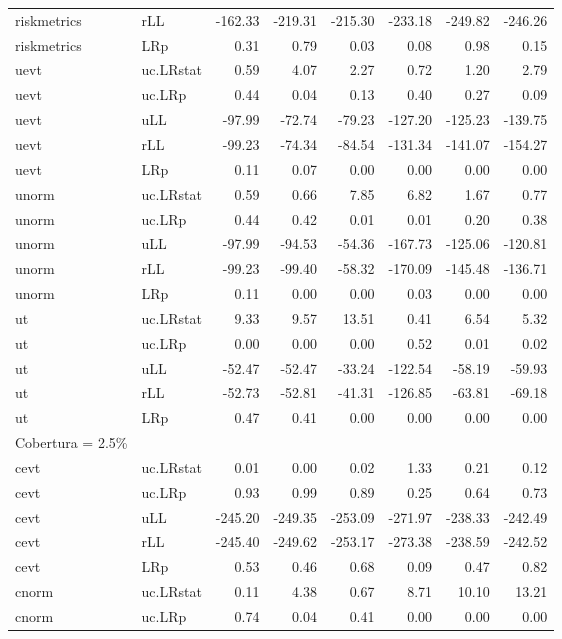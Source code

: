 \begin{longtable}{llrrrrrr}
  riskmetrics & rLL & -162.33 & -219.31 & -215.30 & -233.18 & -249.82 & -246.26 \\ 
  riskmetrics & LRp & 0.31 & 0.79 & 0.03 & 0.08 & 0.98 & 0.15 \\ 
  uevt & uc.LRstat & 0.59 & 4.07 & 2.27 & 0.72 & 1.20 & 2.79 \\ 
  uevt & uc.LRp & 0.44 & 0.04 & 0.13 & 0.40 & 0.27 & 0.09 \\ 
  uevt & uLL & -97.99 & -72.74 & -79.23 & -127.20 & -125.23 & -139.75 \\ 
  uevt & rLL & -99.23 & -74.34 & -84.54 & -131.34 & -141.07 & -154.27 \\ 
  uevt & LRp & 0.11 & 0.07 & 0.00 & 0.00 & 0.00 & 0.00 \\ 
  unorm & uc.LRstat & 0.59 & 0.66 & 7.85 & 6.82 & 1.67 & 0.77 \\ 
  unorm & uc.LRp & 0.44 & 0.42 & 0.01 & 0.01 & 0.20 & 0.38 \\ 
  unorm & uLL & -97.99 & -94.53 & -54.36 & -167.73 & -125.06 & -120.81 \\ 
  unorm & rLL & -99.23 & -99.40 & -58.32 & -170.09 & -145.48 & -136.71 \\ 
  unorm & LRp & 0.11 & 0.00 & 0.00 & 0.03 & 0.00 & 0.00 \\ 
  ut & uc.LRstat & 9.33 & 9.57 & 13.51 & 0.41 & 6.54 & 5.32 \\ 
  ut & uc.LRp & 0.00 & 0.00 & 0.00 & 0.52 & 0.01 & 0.02 \\ 
  ut & uLL & -52.47 & -52.47 & -33.24 & -122.54 & -58.19 & -59.93 \\ 
  ut & rLL & -52.73 & -52.81 & -41.31 & -126.85 & -63.81 & -69.18 \\ 
  ut & LRp & 0.47 & 0.41 & 0.00 & 0.00 & 0.00 & 0.00 \\ 
  Cobertura = 2.5\% &  &  &  &  &  &  &  \\ 
  cevt & uc.LRstat & 0.01 & 0.00 & 0.02 & 1.33 & 0.21 & 0.12 \\ 
  cevt & uc.LRp & 0.93 & 0.99 & 0.89 & 0.25 & 0.64 & 0.73 \\ 
  cevt & uLL & -245.20 & -249.35 & -253.09 & -271.97 & -238.33 & -242.49 \\ 
  cevt & rLL & -245.40 & -249.62 & -253.17 & -273.38 & -238.59 & -242.52 \\ 
  cevt & LRp & 0.53 & 0.46 & 0.68 & 0.09 & 0.47 & 0.82 \\ 
  cnorm & uc.LRstat & 0.11 & 4.38 & 0.67 & 8.71 & 10.10 & 13.21 \\ 
  cnorm & uc.LRp & 0.74 & 0.04 & 0.41 & 0.00 & 0.00 & 0.00 \\ 

\end{longtable}
